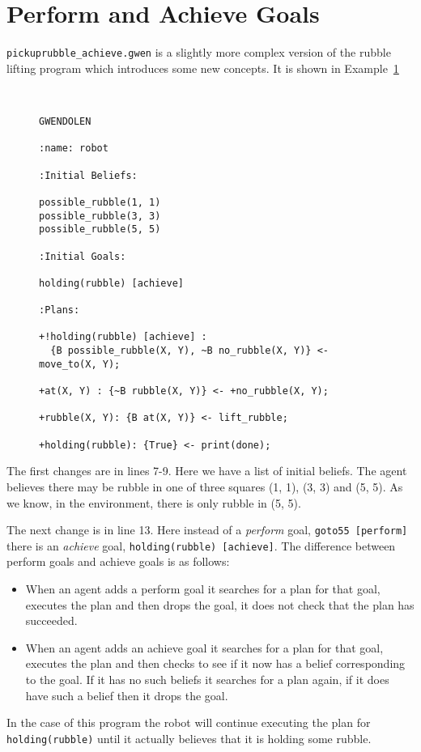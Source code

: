 \section{Perform and Achieve Goals}
\lstinline{pickuprubble_achieve.gwen} is a slightly more complex version of the rubble lifting program which introduces some new concepts.  It is shown in Example~\ref{code:pickuprubble_achieve}
\begin{figure}[htb]
\begin{ourexample}
\label{code:pickuprubble_achieve} \quad \\
\begin{lstlisting}[basicstyle=\sffamily,style=easslisting,language=Gwendolen]
GWENDOLEN

:name: robot

:Initial Beliefs:

possible_rubble(1, 1)
possible_rubble(3, 3)
possible_rubble(5, 5)

:Initial Goals:

holding(rubble) [achieve]

:Plans:

+!holding(rubble) [achieve] : 
  {B possible_rubble(X, Y), ~B no_rubble(X, Y)} <- move_to(X, Y);

+at(X, Y) : {~B rubble(X, Y)} <- +no_rubble(X, Y);

+rubble(X, Y): {B at(X, Y)} <- lift_rubble;

+holding(rubble): {True} <- print(done);
\end{lstlisting}
\end{ourexample}
\end{figure}
The first changes are in lines 7-9.  Here we have a list of initial beliefs.  The agent believes there may be rubble in one of three squares (1, 1), (3, 3) and (5, 5).  As we know, in the environment, there is only rubble in (5, 5).

The next change is in line 13.  Here instead of a \emph{perform} goal, \lstinline{goto55 [perform]} there is an \emph{achieve} goal, \lstinline{holding(rubble) [achieve]}.  The difference between perform goals and achieve goals is as follows:  
\begin{itemize}
\item When an agent adds a perform goal it searches for a plan for that goal, executes the plan and then drops the goal, it does not check that the plan has succeeded.
\item When an agent adds an achieve goal it searches for a plan for that goal, executes the plan and then checks to see if it now has a belief corresponding to the goal.  If it has no such beliefs it searches for a plan again, if it does have such a belief then it drops the goal.
\end{itemize}
In the case of this program the robot will continue executing the plan for \lstinline{holding(rubble)} until it actually believes that it is holding some rubble.

